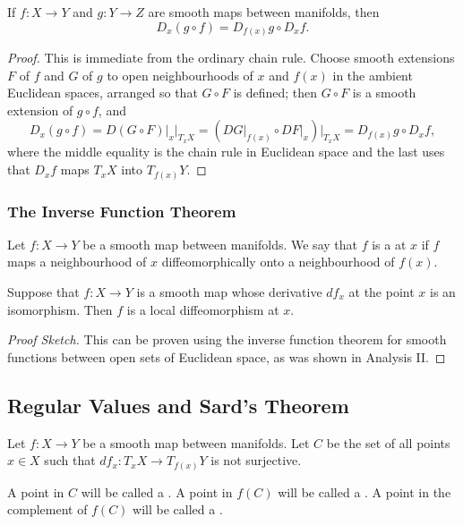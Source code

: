 \documentclass[a4paper]{scrartcl}
\begin{document}
\begin{theorem}
    If $f: X \rightarrow Y$ and $g: Y \rightarrow Z$ are smooth maps between manifolds, then
    $$
    D_x(g \circ f) = D_{f(x)} g \circ D_x f.
    $$
\end{theorem}
\begin{proof}
    This is immediate from the ordinary chain rule. Choose smooth extensions $F$ of $f$ and $G$ of $g$ to open neighbourhoods of $x$ and $f(x)$ in the ambient Euclidean spaces, arranged so that $G \circ F$ is defined; then $G \circ F$ is a smooth extension of $g \circ f$, and
    $$
    D_x(g\circ f) = \left. D(G\circ F)\right|_x \big|_{T_xX} = \left(\left.DG\right|_{f(x)}\circ \left.DF\right|_x\right)\big|_{T_xX} = D_{f(x)}g \circ D_x f,
    $$
    where the middle equality is the chain rule in Euclidean space and the last uses that $D_xf$ maps $T_xX$ into $T_{f(x)}Y$.
\end{proof}


\subsubsection{The Inverse Function Theorem}

Let $f: X \rightarrow Y$ be a smooth map between manifolds. We say that $f$ is a  at $x$ if $f$ maps a neighbourhood of $x$ diffeomorphically onto a neighbourhood of $f(x)$.

\begin{theorem}
    Suppose that $f: X \rightarrow Y$ is a smooth map whose derivative $d f_{x}$ at the point $x$ is an isomorphism. Then $f$ is a local diffeomorphism at $x$.
\end{theorem}
\begin{proof}[Proof Sketch]
    This can be proven using the inverse function theorem for smooth functions between open sets of Euclidean space, as was shown in Analysis II.
\end{proof}


\subsection{Regular Values and Sard's Theorem}
Let $f: X \rightarrow Y$ be a smooth map between manifolds. Let $C$ be the set of all points $x \in X$ such that $d f_{x}: T_{x} X \rightarrow T_{f(x)} Y$ is not surjective.

\begin{definition}
    A point in $C$ will be called a . A point in $f(C)$ will be called a . A point in the complement of $f(C)$ will be called a .
\end{definition}
\end{document}

